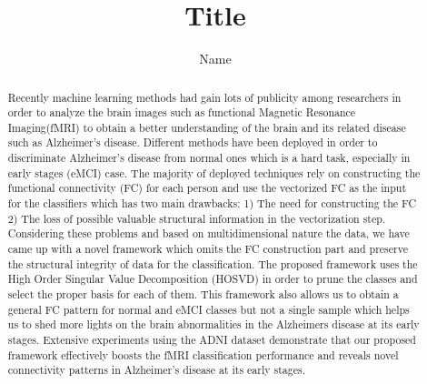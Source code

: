 \documentclass[preprint,12pt]{elsarticle}
\begin{document}
\begin{frontmatter}


 \title{Title}
 \tnotetext[label1]{}
 \author{Name}
 \fntext[label2]{}
 \cortext[cor1]{}
 \address{Address}
 \fntext[label3]{}

\title{}


\author{}

\address{}

\begin{abstract}
Recently machine learning methods had gain lots of publicity among researchers in order to analyze the brain images such as functional Magnetic Resonance Imaging(fMRI) to obtain a better understanding of the brain and its related disease such as Alzheimer's disease. Different methods have been deployed in order to discriminate Alzheimer's disease from normal ones which is a hard task, especially in early stages (eMCI) case. The majority of deployed techniques rely on constructing the functional connectivity (FC) for each person and use the vectorized FC as the input for the classifiers which has two main drawbacks: 1) The need for constructing the FC 2) The loss of possible valuable structural information in the vectorization step.
    Considering these problems and based on multidimensional nature the data, we have came up with a novel framework which omits the FC construction part and preserve the structural integrity of data for the classification.
        The proposed framework uses the High Order Singular Value Decomposition (HOSVD) in order to prune the classes and select the proper basis for each of them.
This framework also allows us to obtain a general FC pattern for normal and eMCI classes but not a single sample which helps us to shed more lights on the brain abnormalities in the Alzheimers disease at its early stages. 
        Extensive experiments using the ADNI dataset demonstrate that
        our proposed framework effectively boosts the fMRI classification performance and reveals novel connectivity patterns in Alzheimer's disease at its early stages.
\end{abstract}


\end{frontmatter}
\end{document}
